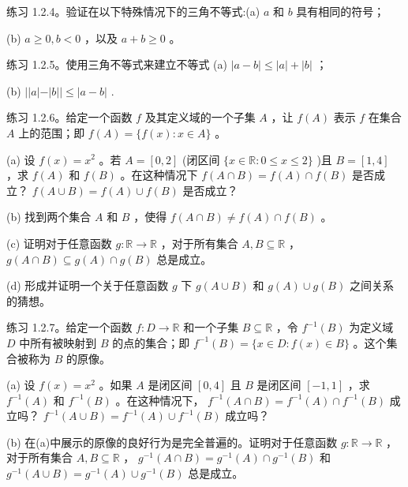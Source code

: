 练习 1.2.4。验证在以下特殊情况下的三角不等式:(a) \(a\) 和 \(b\) 具有相同的符号；

(b) \(a \geq  0,b < 0\) ，以及 \(a + b \geq  0\) 。

练习 1.2.5。使用三角不等式来建立不等式 (a) \(\left| {a - b}\right|  \leq  \left| a\right|  + \left| b\right|\) ；

(b) \(\left| \right| a\left| -\right| b\left| \right|  \leq  \left| {a - b}\right|\) .

练习 1.2.6。给定一个函数 \(f\) 及其定义域的一个子集 \(A\) ，让 \(f\left( A\right)\) 表示 \(f\) 在集合 \(A\) 上的范围；即 \(f\left( A\right)  = \{ f\left( x\right)  : x \in  A\}\) 。

(a) 设 \(f\left( x\right)  = {x}^{2}\) 。若 \(A = \left\lbrack  {0,2}\right\rbrack\) (闭区间 \(\{ x \in  \mathbb{R} : 0 \leq  x \leq  2\}\) )且 \(B = \left\lbrack  {1,4}\right\rbrack\) ，求 \(f\left( A\right)\) 和 \(f\left( B\right)\) 。在这种情况下 \(f\left( {A \cap  B}\right)  = f\left( A\right)  \cap  f\left( B\right)\) 是否成立？ \(f\left( {A \cup  B}\right)  = f\left( A\right)  \cup  f\left( B\right)\) 是否成立？

(b) 找到两个集合 \(A\) 和 \(B\) ，使得 \(f\left( {A \cap  B}\right)  \neq  f\left( A\right)  \cap  f\left( B\right)\) 。

(c) 证明对于任意函数 \(g : \mathbb{R} \rightarrow  \mathbb{R}\) ，对于所有集合 \(A,B \subseteq  \mathbb{R}\) ， \(g\left( {A \cap  B}\right)  \subseteq  g\left( A\right)  \cap  g\left( B\right)\) 总是成立。

(d) 形成并证明一个关于任意函数 \(g\) 下 \(g\left( {A \cup  B}\right)\) 和 \(g\left( A\right)  \cup  g\left( B\right)\) 之间关系的猜想。

练习 1.2.7。给定一个函数 \(f : D \rightarrow  \mathbb{R}\) 和一个子集 \(B \subseteq  \mathbb{R}\) ，令 \({f}^{-1}\left( B\right)\) 为定义域 \(D\) 中所有被映射到 \(B\) 的点的集合；即 \({f}^{-1}\left( B\right)  = \{ x \in  D : f\left( x\right)  \in  B\}\) 。这个集合被称为 \(B\) 的原像。

(a) 设 \(f\left( x\right)  = {x}^{2}\) 。如果 \(A\) 是闭区间 \(\left\lbrack  {0,4}\right\rbrack\) 且 \(B\) 是闭区间 \(\left\lbrack  {-1,1}\right\rbrack\) ，求 \({f}^{-1}\left( A\right)\) 和 \({f}^{-1}\left( B\right)\) 。在这种情况下， \({f}^{-1}\left( {A \cap  B}\right)  = {f}^{-1}\left( A\right)  \cap  {f}^{-1}\left( B\right)\) 成立吗？ \({f}^{-1}\left( {A \cup  B}\right)  = {f}^{-1}\left( A\right)  \cup  {f}^{-1}\left( B\right)\) 成立吗？

(b) 在(a)中展示的原像的良好行为是完全普遍的。证明对于任意函数 \(g : \mathbb{R} \rightarrow  \mathbb{R}\) ，对于所有集合 \(A,B \subseteq  \mathbb{R}\) ， \({g}^{-1}\left( {A \cap  B}\right)  = {g}^{-1}\left( A\right)  \cap  {g}^{-1}\left( B\right)\) 和 \({g}^{-1}\left( {A \cup  B}\right)  = {g}^{-1}\left( A\right)  \cup  {g}^{-1}\left( B\right)\) 总是成立。

